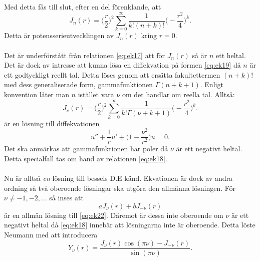 \documentclass{article}
\begin{document}
Med detta fås till slut, efter en del förenklande, att
\begin{equation}
    J_n(r)=\Big(\frac{r}{2}\Big)^2\sum_{k=0}^{\infty}\frac{1}{k!(n+k)!}\Big(-\frac{r^2}{4}\Big)^k.
\end{equation}
Detta är potensserieutvecklingen av $J_n(r)$ kring $r=0$.\\ \\
Det är underförstått från relationen \eqref{eq:ek17} att för $J_n(r)$ så är $n$ ett heltal. Det är dock av intresse att kunna lösa en diffekvation på formen \eqref{eq:ek19} då $n$ är ett godtyckligt reellt tal. Detta löses genom att ersätta fakultettermen $(n+k)!$ med dess generaliserade form, gammafunktionen $\Gamma(n+k+1)$. Enligt konvention låter man $n$ istället vara $\nu$ om det handlar om reella tal. Alltså:
\begin{equation}
    J_{\nu}(r)=\Big(\frac{r}{2}\Big)^2\sum_{k=0}^{\infty}\frac{1}{k!\Gamma(\nu+k+1)}\Big(-\frac{r^2}{4}\Big)^k.
\end{equation}
är en lösning till diffekvationen
\begin{equation}\label{eq:ek22}
    u''+\frac{1}{r}u'+\Big(1-\frac{\nu^2}{r^2}\Big)u=0.
\end{equation}
Det ska anmärkas att gammafunktionen har poler då $\nu$ är ett negativt heltal. Detta specialfall tas om hand av relationen \eqref{eq:ek18}.\\ \\
Nu är alltså \textit{en} lösning till bessels D.E känd. Ekvationen är dock av andra ordning så två oberoende lösningar ska utgöra den allmänna lösningen. För $\nu\neq -1,-2,...$ så inses att 
$$
aJ_{\nu}(r)+bJ_{-\nu}(r)
$$
är en allmän lösning till \eqref{eq:ek22}. Däremot är dessa inte oberoende om $\nu$ är ett negativt heltal då \eqref{eq:ek18} innebär att lösningarna inte är oberoende. Detta löste Neumann med att introducera
\begin{equation}\label{eq:ekY}
    Y_{\nu}(r)=\frac{J_{\nu}(r)\cos(\pi\nu)-J_{-\nu}(r)}{\sin(\pi\nu)}.
\end{equation}
\end{document}
